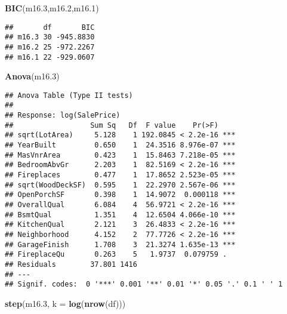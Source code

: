 \documentclass[
]{article}
\newenvironment{Shaded}{\begin{snugshade}}{\end{snugshade}}
\newcommand{\AttributeTok}[1]{\textcolor[rgb]{0.13,0.29,0.53}{#1}}
\newcommand{\FloatTok}[1]{\textcolor[rgb]{0.00,0.00,0.81}{#1}}
\newcommand{\FunctionTok}[1]{\textcolor[rgb]{0.13,0.29,0.53}{\textbf{#1}}}
\newcommand{\NormalTok}[1]{#1}
\begin{document}
\begin{Shaded}
\begin{Highlighting}[]
\FunctionTok{BIC}\NormalTok{(m16}\FloatTok{.3}\NormalTok{,m16}\FloatTok{.2}\NormalTok{,m16}\FloatTok{.1}\NormalTok{)}
\end{Highlighting}
\end{Shaded}

\begin{verbatim}
##       df       BIC
## m16.3 30 -945.8830
## m16.2 25 -972.2267
## m16.1 22 -929.0607
\end{verbatim}

\begin{Shaded}
\begin{Highlighting}[]
\FunctionTok{Anova}\NormalTok{(m16}\FloatTok{.3}\NormalTok{)}
\end{Highlighting}
\end{Shaded}

\begin{verbatim}
## Anova Table (Type II tests)
## 
## Response: log(SalePrice)
##                  Sum Sq   Df  F value    Pr(>F)    
## sqrt(LotArea)     5.128    1 192.0845 < 2.2e-16 ***
## YearBuilt         0.650    1  24.3516 8.976e-07 ***
## MasVnrArea        0.423    1  15.8463 7.218e-05 ***
## BedroomAbvGr      2.203    1  82.5169 < 2.2e-16 ***
## Fireplaces        0.477    1  17.8652 2.523e-05 ***
## sqrt(WoodDeckSF)  0.595    1  22.2970 2.567e-06 ***
## OpenPorchSF       0.398    1  14.9072  0.000118 ***
## OverallQual       6.084    4  56.9721 < 2.2e-16 ***
## BsmtQual          1.351    4  12.6504 4.066e-10 ***
## KitchenQual       2.121    3  26.4833 < 2.2e-16 ***
## Neighborhood      4.152    2  77.7726 < 2.2e-16 ***
## GarageFinish      1.708    3  21.3274 1.635e-13 ***
## FireplaceQu       0.263    5   1.9737  0.079759 .  
## Residuals        37.801 1416                       
## ---
## Signif. codes:  0 '***' 0.001 '**' 0.01 '*' 0.05 '.' 0.1 ' ' 1
\end{verbatim}

\begin{Shaded}
\begin{Highlighting}[]
\FunctionTok{step}\NormalTok{(m16}\FloatTok{.3}\NormalTok{, }\AttributeTok{k =} \FunctionTok{log}\NormalTok{(}\FunctionTok{nrow}\NormalTok{(df)))}
\end{Highlighting}
\end{Shaded}
\end{document}
